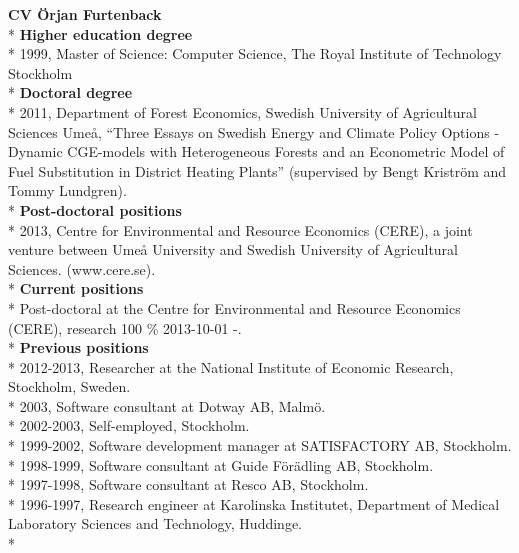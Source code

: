 \textbf{CV Örjan Furtenback}\\*
\textbf{Higher education degree}\\*
1999, Master of Science: Computer Science, The Royal Institute of Technology Stockholm\\*
\textbf{Doctoral degree}\\*
2011, Department of Forest Economics, Swedish University of Agricultural Sciences Umeå, “Three Essays on Swedish Energy and Climate Policy Options -
Dynamic CGE-models with Heterogeneous Forests and an Econometric Model of Fuel
Substitution in District Heating Plants” (supervised by Bengt Kriström and Tommy Lundgren).\\*
\textbf{Post-doctoral positions}\\*
2013, Centre for Environmental and Resource Economics (CERE),  a joint venture between Umeå University and Swedish University of Agricultural Sciences. (www.cere.se).\\*
\textbf{Current positions}\\*
Post-doctoral at the Centre for Environmental and Resource Economics (CERE), research 100 \% 2013-10-01 -.\\*
\textbf{Previous positions}\\*
2012-2013, Researcher at the National Institute of Economic Research, Stockholm, Sweden.\\*
2003, Software consultant at Dotway AB, Malmö.\\*
2002-2003, Self-employed, Stockholm.\\*
1999-2002, Software development manager at SATISFACTORY AB, Stockholm.\\*
1998-1999, Software consultant at Guide Förädling AB, Stockholm.\\*
1997-1998, Software consultant at Resco AB, Stockholm.\\*
1996-1997, Research engineer at Karolinska Institutet, Department of Medical Laboratory Sciences and Technology, Huddinge.\\*
